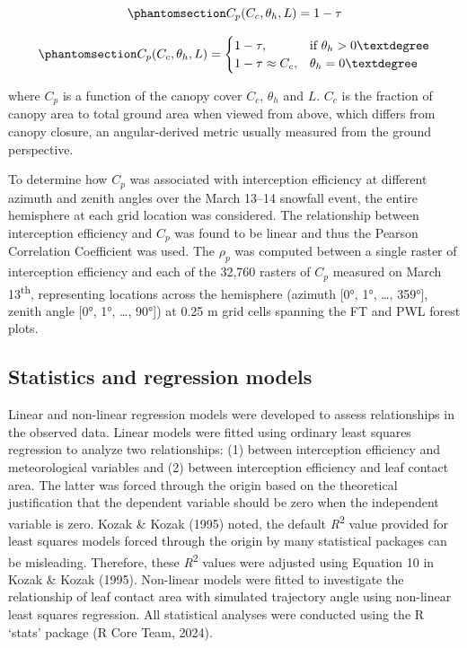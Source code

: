\documentclass[
  letterpaper,
  DIV=11,
  numbers=noendperiod]{scrartcl}
\begin{document}
\begin{equation}\phantomsection\label{eq-lca}{
C_p(C_c, \theta_h, L) = 1-\tau
}\end{equation}

\begin{equation}\phantomsection\label{eq-tf-ode}{
C_p(C_c, \theta_h, L) = \begin{cases}
    1-\tau,& \text{if } \theta_h> 0°\\
    1-\tau \approx C_c ,              & \theta_h= 0°
\end{cases}
}\end{equation}

where \(C_p\) is a function of the canopy cover \(C_c\), \(\theta_h\)
and \(L\). \(C_c\) is the fraction of canopy area to total ground area
when viewed from above, which differs from canopy closure, an
angular-derived metric usually measured from the ground perspective.

To determine how \(C_p\) was associated with interception efficiency at
different azimuth and zenith angles over the March 13--14 snowfall
event, the entire hemisphere at each grid location was considered. The
relationship between interception efficiency and \(C_p\) was found to be
linear and thus the Pearson Correlation Coefficient was used. The
\(\rho_p\) was computed between a single raster of interception
efficiency and each of the 32,760 rasters of \(C_p\) measured on March
13\textsuperscript{th}, representing locations across the hemisphere
(azimuth {[}0°, 1°, \ldots, 359°{]}, zenith angle {[}0°, 1°, \ldots,
90°{]}) at 0.25 m grid cells spanning the FT and PWL forest plots.

\subsection{Statistics and regression
models}\label{statistics-and-regression-models}

Linear and non-linear regression models were developed to assess
relationships in the observed data. Linear models were fitted using
ordinary least squares regression to analyze two relationships: (1)
between interception efficiency and meteorological variables and (2)
between interception efficiency and leaf contact area. The latter was
forced through the origin based on the theoretical justification that
the dependent variable should be zero when the independent variable is
zero. Kozak \& Kozak (1995) noted, the default
\emph{R}\textsuperscript{2} value provided for least squares models
forced through the origin by many statistical packages can be
misleading. Therefore, these \emph{R}\textsuperscript{2} values were
adjusted using Equation 10 in Kozak \& Kozak (1995). Non-linear models
were fitted to investigate the relationship of leaf contact area with
simulated trajectory angle using non-linear least squares regression.
All statistical analyses were conducted using the R `stats' package (R
Core Team, 2024).
\end{document}
